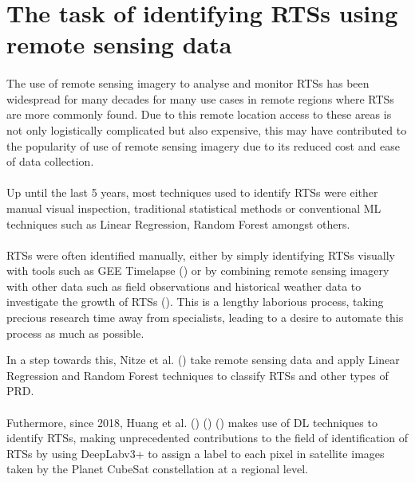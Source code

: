 \paragraph{}

\section{The task of identifying \gls{RTS}s using remote sensing data} \label{rts_task}
\paragraph{}
The use of remote sensing imagery to analyse and monitor \gls{RTS}s has been widespread for many decades for many use cases in remote regions where \gls{RTS}s are more commonly found. Due to this remote location access to these areas is not only logistically complicated but also expensive, this may have contributed to the popularity of use of remote sensing imagery due to its reduced cost and ease of data collection.
\paragraph{}
Up until the last 5 years, most techniques used to identify \gls{RTS}s were either manual visual inspection, traditional statistical methods or conventional \gls{ML} techniques such as Linear Regression, Random Forest amongst others.

\paragraph{}
\gls{RTS}s were often identified manually, either by simply identifying \gls{RTS}s visually with tools such as \gls{GEE} Timelapse (\cite{lewkowicz_extremes_2019}) or by combining remote sensing imagery with other data such as field observations and historical weather data to investigate the growth of \gls{RTS}s (\cite{KOKELJ201556}). This is a lengthy laborious process, taking precious research time away from specialists, leading to a desire to automate this process as much as possible.

In a step towards this, Nitze et al. (\cite{articleing2018}) take remote sensing data and apply Linear Regression and Random Forest techniques to classify \gls{RTS}s and other types of \gls{PRD}.

\paragraph{}
Futhermore, since 2018, Huang et al. (\cite{HUANG10122067}) (\cite{HUANG2020111534}) (\cite{HUANG2021102399}) makes use of \gls{DL} techniques to identify \gls{RTS}s, making unprecedented contributions to the field of identification of \gls{RTS}s by using DeepLabv3+ to assign a label to each pixel in satellite images taken by the Planet CubeSat constellation at a regional level.

